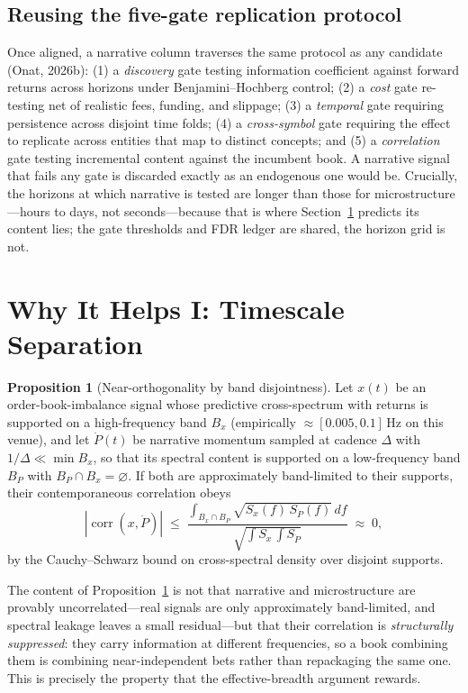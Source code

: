 \documentclass[11pt,a4paper]{article}
\theoremstyle{definition}
\newtheorem{proposition}{Proposition}[section]
\theoremstyle{plain}
\newcommand{\corr}{\operatorname{corr}}
\begin{document}
\subsection{Reusing the five-gate replication protocol}

Once aligned, a narrative column traverses the same protocol as any candidate (Onat, 2026b):
(1) a \emph{discovery} gate testing information coefficient against forward returns across horizons
under Benjamini--Hochberg control; (2) a \emph{cost} gate re-testing net of realistic fees, funding,
and slippage; (3) a \emph{temporal} gate requiring persistence across disjoint time folds;
(4) a \emph{cross-symbol} gate requiring the effect to replicate across entities that map to distinct
concepts; and (5) a \emph{correlation} gate testing incremental content against the incumbent book.
A narrative signal that fails any gate is discarded exactly as an endogenous one would be. Crucially,
the horizons at which narrative is tested are longer than those for microstructure---hours to days,
not seconds---because that is where Section~\ref{sec:timescale} predicts its content lies; the gate
thresholds and FDR ledger are shared, the horizon grid is not.

\section{Why It Helps I: Timescale Separation}
\label{sec:timescale}

\begin{proposition}[Near-orthogonality by band disjointness]
\label{prop:band}
Let $x(t)$ be an order-book-imbalance signal whose predictive cross-spectrum with returns is supported
on a high-frequency band $B_x$ (empirically $\approx[0.005,0.1]$\,Hz on this venue), and let $\dot P(t)$
be narrative momentum sampled at cadence $\Delta$ with $1/\Delta \ll \min B_x$, so that its spectral
content is supported on a low-frequency band $B_P$ with $B_P\cap B_x=\varnothing$. If both are
approximately band-limited to their supports, their contemporaneous correlation obeys
\[
  |\corr(x,\dot P)| \;\le\; \frac{\int_{B_x\cap B_P} \sqrt{S_x(f)\,S_{\dot P}(f)}\,df}
       {\sqrt{\int S_x \, \int S_{\dot P}}} \;\approx\; 0,
\]
by the Cauchy--Schwarz bound on cross-spectral density over disjoint supports.
\end{proposition}

The content of Proposition~\ref{prop:band} is not that narrative and microstructure are provably
uncorrelated---real signals are only approximately band-limited, and spectral leakage leaves a small
residual---but that their correlation is \emph{structurally suppressed}: they carry information at
different frequencies, so a book combining them is combining near-independent bets rather than
repackaging the same one. This is precisely the property that the effective-breadth argument rewards.
\end{document}
